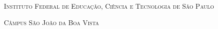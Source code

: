 \begin{titlingpage}
    
    
    \center
    
    \noindent
    \chaptitlefont\large\textsc{Instituto Federal de Educação, Ciência e Tecnologia de São Paulo}
    \vspace{0.5cm}

    \noindent    
    \chaptitlefont\large\textsc{Câmpus São João da Boa Vista}
    \vspace{3.5cm}
    
    \noindent
    \chaptitlefont\Large\textsc{\theauthor}
    \vspace{0.5cm}
    \vspace{3.5cm}
    
    \noindent
    \chaptitlefont\HUGE\textsc{\thetitle}
    \vspace*{\fill}

    \noindent
    \large\textsc{\thedate}
    
    \restoregeometry
    
\end{titlingpage}

